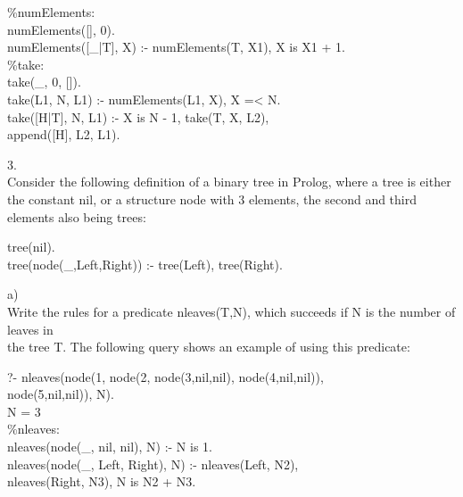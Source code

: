 \documentclass[12pt]{article}
\begin{document}
\begin{flushleft}
{\qquad \qquad \%numElements:\\	
\qquad \qquad numElements([], 0).\\
\qquad \qquad numElements([\_|T], X) :- numElements(T, X1), X is X1 + 1.\\
[2mm]
\qquad \qquad \%take:\\
\qquad \qquad take(\_, 0, []).\\
\qquad \qquad take(L1, N, L1) :- numElements(L1, X), X =< N.\\
\qquad \qquad take([H|T], N, L1) :- X is N - 1, take(T, X, L2),\\
\qquad \qquad \qquad \qquad \qquad \qquad \qquad \qquad \qquad  \qquad \qquad \qquad \qquad append([H], L2, L1).\\
}

3.\\
Consider the following definition of a binary tree in Prolog, where a tree is either the constant {\selectfont nil}, or a structure {\selectfont node} with 3 elements, the second and third elements also being trees:\\
[2mm]

{\selectfont
	
\qquad tree(nil).\\
\qquad tree(node(\_,Left,Right)) :- tree(Left), tree(Right).\\
[4mm]

}

\qquad a)\\
\qquad Write the rules for a predicate {\selectfont nleaves(T,N)}, which succeeds if {\selectfont N} is the number
of leaves in\\
\qquad the tree {\selectfont T}. The following query shows an example of using this predicate:\\
[2mm]
{\selectfont
	
\qquad \qquad ?- nleaves(node(1, node(2, node(3,nil,nil), node(4,nil,nil)),\\
\qquad \qquad node(5,nil,nil)), N).\\
\qquad \qquad N = 3\\
[6mm]

\qquad \qquad \qquad \%nleaves:\\
\qquad \qquad \qquad nleaves(node(\_, nil, nil), N) :- N is 1.\\
\qquad \qquad \qquad nleaves(node(\_, Left, Right), N) :- nleaves(Left, N2),\\
\qquad \qquad \qquad \qquad \qquad \qquad \qquad \qquad \qquad nleaves(Right, N3), N is N2 + N3.\\
[6mm]
}


\end{flushleft}
\end{document}
